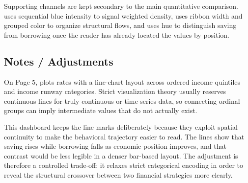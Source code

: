 \documentclass[../main.tex]{subfiles}
\begin{document}
Supporting channels are kept secondary to the main quantitative comparison.
 uses sequential blue
intensity to signal weighted density,
 uses ribbon
width and grouped color to organize structural flows, and
 uses hue
to distinguish saving from borrowing once the reader has already located the
values by position.

\subsection{Notes / Adjustments}

On Page 5, 
plots rates with a line-chart layout across ordered income quintiles and income
runway categories. Strict visualization theory usually reserves continuous
lines for truly continuous or time-series data, so connecting ordinal groups
can imply intermediate values that do not actually exist.

This dashboard keeps the line marks deliberately because they exploit spatial
continuity to make the behavioral trajectory easier to read. The lines show
that saving rises while borrowing falls as economic position improves, and that
contrast would be less legible in a denser bar-based layout. The adjustment is
therefore a controlled trade-off: it relaxes strict categorical encoding in
order to reveal the structural crossover between two financial strategies more
clearly.
\end{document}
